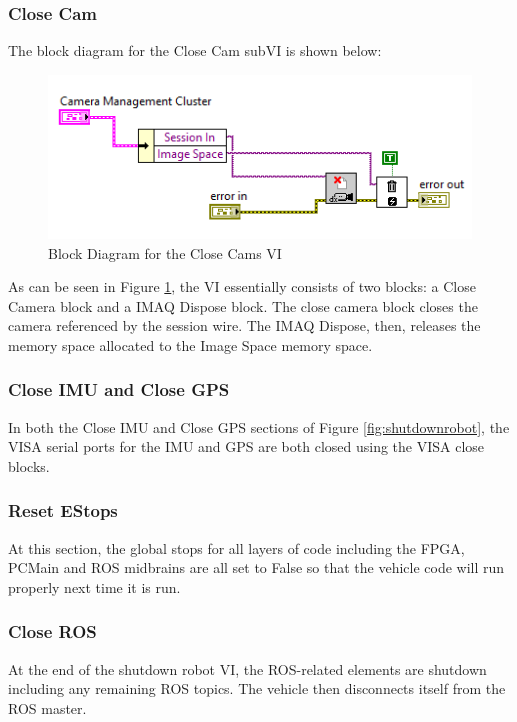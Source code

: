 \subsubsection{Close Cam}

The block diagram for the Close Cam subVI is shown below:

\begin{figure}[h!]
\centering
\includegraphics[scale=0.85]{Photos/closecams.png}
\caption{Block Diagram for the Close Cams VI}
\label{fig:closecams}
\end{figure}

\noindent As can be seen in Figure \ref{fig:closecams}, the VI essentially consists of two blocks: a Close Camera block and a IMAQ Dispose block. The close camera block closes the camera referenced by the session wire. The IMAQ Dispose, then, releases the memory space allocated to the Image Space memory space. 

\subsubsection {Close IMU and Close GPS}

In both the Close IMU and Close GPS sections of Figure \ref{fig:shutdownrobot}, the VISA serial ports for the IMU and GPS are both closed using the VISA close blocks.

\subsubsection{Reset EStops}
\label{sec:resetestops}

At this section, the global stops for all layers of code including the FPGA, PCMain and ROS midbrains are all set to False so that the vehicle code will run properly next time it is run.

\subsubsection{Close ROS}

At the end of the shutdown robot VI, the ROS-related elements are shutdown including any remaining ROS topics. The vehicle then disconnects itself from the ROS master.

